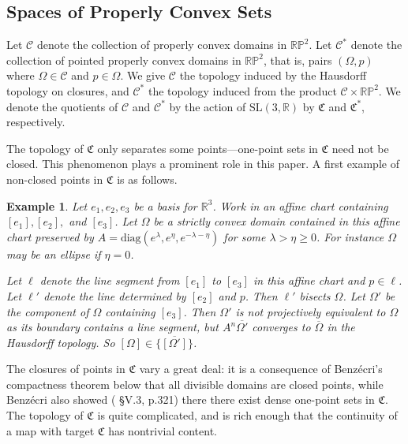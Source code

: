 \documentclass[12pt,a4paper]{amsart}
\theoremstyle{definition}
\theoremstyle{plain}
\newtheorem{example}[theorem]{Example}
\numberwithin{equation}{section}
\begin{document}
\subsection{Spaces of Properly Convex Sets}\label{subsection-spaces-of-convex-sets}

Let $\mathcal{C}$ denote the collection of properly convex domains in $\mathbb{RP}^2$. Let $\mathcal{C}^*$ denote the collection of pointed properly convex domains in $\mathbb{RP}^2$, that is, pairs $(\Omega, p)$ where $\Omega \in \mathcal{C}$ and $p \in \Omega$. We give $\mathcal{C}$ the topology induced by the Hausdorff topology on closures, and $\mathcal{C}^*$ the topology induced from the product $\mathcal{C} \times \mathbb{RP}^2$.  We denote the quotients of $\mathcal{C}$ and $\mathcal{C}^*$ by the action of $\text{SL}(3, \mathbb{R})$ by $\mathfrak{C}$ and $\mathfrak{C}^*$, respectively.

The topology of $\mathfrak{C}$ only separates some points---one-point sets in $\mathfrak{C}$ need not be closed. This phenomenon plays a prominent role in this paper. A first example of non-closed points in $\mathfrak{C}$ is as follows.

\begin{example}
    Let $e_1, e_2, e_3$ be a basis for $\mathbb{R}^3$. Work in an affine chart containing $[e_1], [e_2],$ and $[e_3]$. Let $\Omega$ be a strictly convex domain contained in this affine chart preserved by {\rm{$A = \text{diag}(e^{\lambda}, e^{\eta}, e^{-\lambda - \eta})$}} for some $\lambda > \eta \geq 0$. For instance $\Omega$ may be an ellipse if $\eta = 0$.
    
    Let $\ell$ denote the line segment from $[e_1]$ to $[e_3]$ in this affine chart and $p \in \ell$. Let $\ell'$ denote the line determined by $[e_2]$ and $p$. Then $\ell'$ bisects $\Omega$. Let $\Omega'$ be the component of $\Omega$ containing $[e_3]$. Then $\Omega'$ is not projectively equivalent to $\Omega$ as its boundary contains a line segment, but $A^n \overline{\Omega'}$ converges to $\overline{\Omega}$ in the Hausdorff topology. So $[\Omega] \in \overline{ \{[\Omega'] \}}$.
\end{example}

The closures of points in $\mathfrak{C}$ vary a great deal: it is a consequence of Benz\'ecri's compactness theorem below that all divisible domains are closed points, while Benz\'ecri also showed (\cite{benzecri1960thesis} \S V.3, p.321) there there exist dense one-point sets in $\mathfrak{C}$. The topology of $\mathfrak{C}$ is quite complicated, and is rich enough that the continuity of a map with target $\mathfrak{C}$ has nontrivial content.
\end{document}

